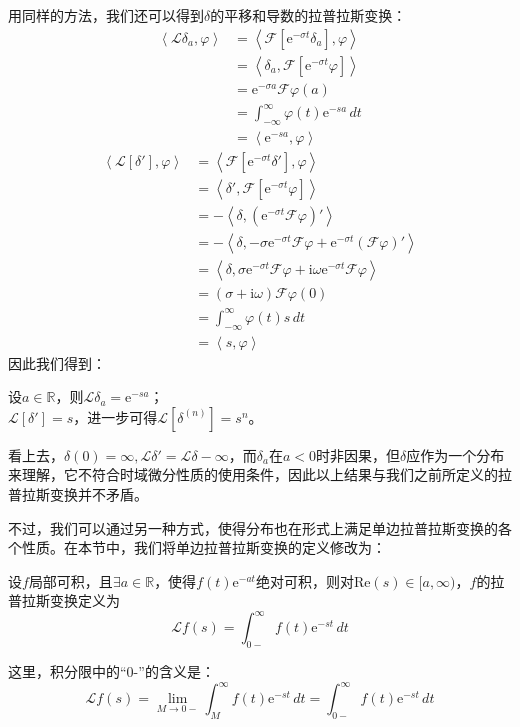 用同样的方法，我们还可以得到$\delta$的平移和导数的拉普拉斯变换：
\begin{align*}
    \left\langle \mathcal{L}\delta_a,\varphi\right\rangle&=\left\langle \mathcal{F} [\mathrm{e}^{-\sigma t}\delta_a],\varphi\right\rangle\\
    &=\left\langle \delta_a,\mathcal{F} [\mathrm{e}^{-\sigma t}\varphi]\right\rangle\\
    &=\mathrm{e}^{-\sigma a}\mathcal{F}\varphi(a)\\
    &=\int_{-\infty}^{\infty}\varphi(t)\mathrm{e}^{-s a}\,dt\\
    &=\left\langle \mathrm{e}^{-s a},\varphi\right\rangle
\end{align*}
\begin{align*}
    \left\langle \mathcal{L}\left[\delta'\right],\varphi\right\rangle&=\left\langle \mathcal{F} [\mathrm{e}^{-\sigma t}\delta'],\varphi\right\rangle\\
    &=\left\langle \delta',\mathcal{F} [\mathrm{e}^{-\sigma t}\varphi]\right\rangle\\
    &=-\left\langle \delta,\left(\mathrm{e}^{-\sigma t}\mathcal{F} \varphi\right)'\right\rangle\\
    &=-\left\langle \delta,-\sigma \mathrm{e}^{-\sigma t}\mathcal{F} \varphi + \mathrm{e}^{-\sigma t}(\mathcal{F} \varphi)'\right\rangle\\
    &=\left\langle \delta,\sigma \mathrm{e}^{-\sigma t}\mathcal{F} \varphi + \mathrm{i}\omega \mathrm{e}^{-\sigma t}\mathcal{F} \varphi\right\rangle\\
    &=(\sigma + \mathrm{i}\omega)\mathcal{F} \varphi(0)\\
    &=\int_{-\infty}^{\infty}\varphi(t)s\,dt\\
    &=\left\langle s,\varphi\right\rangle
\end{align*}
因此我们得到：
\begin{proposition}
    设$a\in\mathbb{R}$，则$\mathcal{L} \delta_a=\mathrm{e}^{-s a}$；\\
    $\mathcal{L} \left[\delta'\right]=s$，进一步可得$\mathcal{L} \left[\delta^{(n)}\right]=s^n$。
\end{proposition}

看上去，$\delta(0)=\infty,\mathcal{L} \delta'=\mathcal{L} \delta-\infty$，而$\delta_a$在$a<0$时非因果，但$\delta$应作为一个分布来理解，它不符合时域微分性质的使用条件，因此以上结果与我们之前所定义的拉普拉斯变换并不矛盾。

不过，我们可以通过另一种方式，使得分布也在形式上满足单边拉普拉斯变换的各个性质。在本节中，我们将单边拉普拉斯变换的定义修改为：
\begin{definition}
    设$f$局部可积，且$\exists a\in\mathbb{R}$，使得$f(t)\mathrm{e}^{-at}$绝对可积，则对$\mathrm{Re}(s)\in[a,\infty)$，$f$的拉普拉斯变换定义为
    \[\mathcal{L} f(s)=\int_{0-}^{\infty}f(t)\mathrm{e}^{-st}\,dt\]
\end{definition}
这里，积分限中的“0-”的含义是：
\[\mathcal{L} f(s)=\lim_{M\to 0-}\int_{M}^{\infty}f(t)\mathrm{e}^{-st}\,dt=\int_{0-}^{\infty}f(t)\mathrm{e}^{-st}\,dt\]

